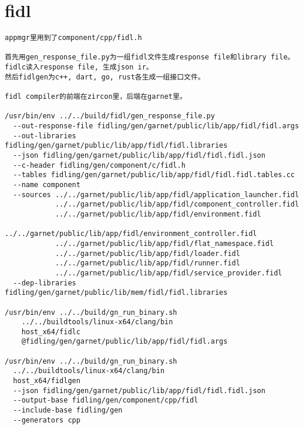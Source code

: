 \section{fidl}

\begin{verbatim}
appmgr里用到了component/cpp/fidl.h

首先用gen_response_file.py为一组fidl文件生成response file和library file。
fidlc读入response file, 生成json ir。
然后fidlgen为c++, dart, go, rust各生成一组接口文件。

fidl compiler的前端在zircon里，后端在garnet里。

/usr/bin/env ../../build/fidl/gen_response_file.py 
  --out-response-file fidling/gen/garnet/public/lib/app/fidl/fidl.args 
  --out-libraries fidling/gen/garnet/public/lib/app/fidl/fidl.libraries 
  --json fidling/gen/garnet/public/lib/app/fidl/fidl.fidl.json 
  --c-header fidling/gen/component/c/fidl.h 
  --tables fidling/gen/garnet/public/lib/app/fidl/fidl.fidl.tables.cc 
  --name component 
  --sources ../../garnet/public/lib/app/fidl/application_launcher.fidl 
            ../../garnet/public/lib/app/fidl/component_controller.fidl 
            ../../garnet/public/lib/app/fidl/environment.fidl 
            ../../garnet/public/lib/app/fidl/environment_controller.fidl 
            ../../garnet/public/lib/app/fidl/flat_namespace.fidl 
            ../../garnet/public/lib/app/fidl/loader.fidl 
            ../../garnet/public/lib/app/fidl/runner.fidl 
            ../../garnet/public/lib/app/fidl/service_provider.fidl 
  --dep-libraries fidling/gen/garnet/public/lib/mem/fidl/fidl.libraries

/usr/bin/env ../../build/gn_run_binary.sh 
    ../../buildtools/linux-x64/clang/bin 
    host_x64/fidlc 
    @fidling/gen/garnet/public/lib/app/fidl/fidl.args

/usr/bin/env ../../build/gn_run_binary.sh 
  ../../buildtools/linux-x64/clang/bin 
  host_x64/fidlgen 
  --json fidling/gen/garnet/public/lib/app/fidl/fidl.fidl.json 
  --output-base fidling/gen/component/cpp/fidl 
  --include-base fidling/gen 
  --generators cpp


\end{verbatim}